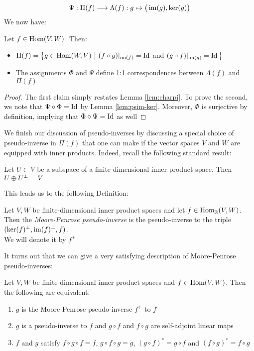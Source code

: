 \[
\Psi: \Pi(f)\longrightarrow \Lambda(f): g\mapsto \big(\operatorname{im}(g),\ker(g)\big)
\]
We now have:
\begin{lemma}\label{lem:psinverses}
	Let $f \in \operatorname{Hom}(V,W)$. Then:
	\begin{itemize}
		\item 
		$\Pi(f)=\big\{ g \in \operatorname{Hom}(W,V)\,\,\big\vert\,\, (f\circ g)\arrowvert_{\operatorname{im}(f)}=\operatorname{Id}$ \textrm{ and } $(g\circ f)\arrowvert_{\operatorname{im}(g)}=\operatorname{Id} \big\} $
		\item The assignments $\Phi$ and $\Psi$ define 1:1 correspondences between $\Lambda(f)$ and $\Pi(f)$
	\end{itemize}
\end{lemma}


\begin{proof}
	The first claim simply restates Lemma \ref{lem:charpi}. To prove the second, we note that $\Psi\circ \Phi=\operatorname{Id}$  by Lemma \ref{lem:psim-ker}. Moreover, $\Phi$ is surjective by definition, implying that $\Phi\circ \Psi =\operatorname{Id}$ as well
\end{proof}



\noindent We finish our discussion of pseudo-inverses by discussing a special choice of pseudo-inverse in $\Pi(f)$ that one can make if the vector spaces $V$ and $W$ are equipped with inner products. Indeed, recall the following standard result:

\begin{lemma}
 Let $U \subset V$ be a subspace of a finite dimensional inner product space. Then $U\oplus U^{\perp}=V$
\end{lemma}

This leads us to the following Definition:
\begin{definition}\label{def:mpinverse}
Let $V,W$ be finite-dimensional inner product spaces and let $f \in \operatorname{Hom}_{\mathbb{R}}(V,W)$. Then the \emph{Moore-Penrose pseudo-inverse} is the pseudo-inverse to the triple $(\ker(f)^\perp,\operatorname{im}(f)^\perp,f)$.\\ We will denote it by $f^+$
\end{definition}

\noindent It turns out that we can give a very satisfying description of Moore-Penrose pseudo-inverses:

\begin{lemma}\label{lem:mppschar}
	Let $V, W$ be finite-dimensional inner product spaces and $f \in \operatorname{Hom}(V,W)$. Then the following are equivalent:
	\begin{enumerate}
		\item $g$ is the Moore-Penrose pseudo-inverse $f^+$ to $f$
		\item $g$ is a pseudo-inverse to $f$ and $g\circ f$ and $f \circ g$ are self-adjoint linear maps
		\item $f$ and $g$ satisfy $f\circ g \circ f=f$, $g\circ f\circ g =g$,  $(g\circ f)^*=g\circ f$ and $(f\circ g)^* =f\circ g$
	\end{enumerate}
\end{lemma}

